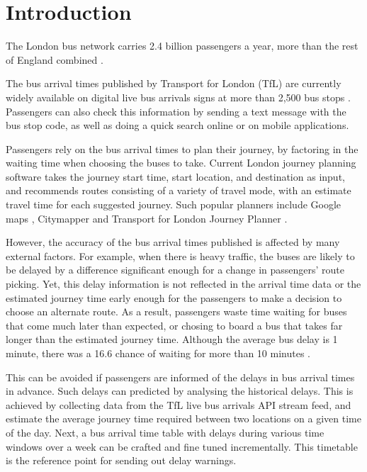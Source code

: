 \chapter{Introduction}

The London bus network carries 2.4 billion passengers a year, more than the rest of England combined \cite{tfl_annual_report_13/14}. 

\par The bus arrival times published by Transport for London (TfL) are currently widely available on digital live bus arrivals signs at more than 2,500 bus stops \cite{live_bus_arrivals}. Passengers can also check this information by sending a text message with the bus stop code, as well as doing a quick search online or on mobile applications. 

\par Passengers rely on the bus arrival times to plan their journey, by factoring in the waiting time when choosing the buses to take. Current London journey planning software takes the journey start time, start location, and destination as input, and recommends routes consisting of a variety of travel mode, with an estimate travel time for each suggested journey. Such popular planners include Google maps \cite{google_maps}, Citymapper \cite{citymapper} and Transport for London Journey Planner \cite{tfl_journey_planner}.

\par However, the accuracy of the bus arrival times published is affected by many external factors. For example, when there is heavy traffic, the buses are likely to be delayed by a difference significant enough for a change in passengers' route picking. Yet, this delay information is not reflected in the arrival time data or the estimated journey time early enough for the passengers to make a decision to choose an alternate route. As a result, passengers waste time waiting for buses that come much later than expected, or chosing to board a bus that takes far longer than the estimated journey time. Although the average bus delay is 1 minute, there was a 16.6 chance of waiting for more than 10 minutes \cite{buses_performance_data}.

\par This can be avoided if passengers are informed of the delays in bus arrival times in advance. Such delays can predicted by analysing the historical delays. This is achieved by collecting data from the TfL live bus arrivals API stream feed, and estimate the average journey time required between two locations on a given time of the day. Next, a bus arrival time table with delays during various time windows over a week can be crafted and fine tuned incrementally. This timetable is the reference point for sending out delay warnings.